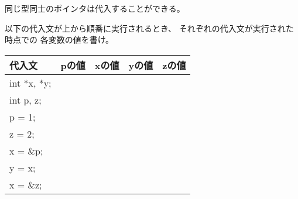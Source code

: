 \documentclass[12pt,a4j]{jarticle}
\newcounter{toi}
\def\toi{%
\bigskip\bigskip\noindent
\addtocounter{toi}{1}
\shadowbox{\bfseries\large 問\thetoi}
\nopagebreak[4]\bigskip\nopagebreak[4]
}
\begin{document}



\toi

同じ型同士のポインタは代入することができる。

以下の代入文が上から順番に実行されるとき、
それぞれの代入文が実行された時点での
各変数の値を書け。

\begin{center}\ttfamily
 \begin{tabular}{|l|c|c|c|c|}\hline
  代入文 & pの値 & xの値 & yの値 & zの値\\ \hline\hline
  int *x, *y; & & & & \\  \cline{2-5}
  int p, z; & & & & \\  \cline{2-5}
  p = 1; & & & & \\  \cline{2-5}
  z = 2; & & & & \\  \cline{2-5}
  x = \&p; & & & & \\  \cline{2-5}
  y = x; & & & & \\  \cline{2-5}
  x = \&z;   & & & & \\  \hline
 \end{tabular}
\end{center}

\end{document}
